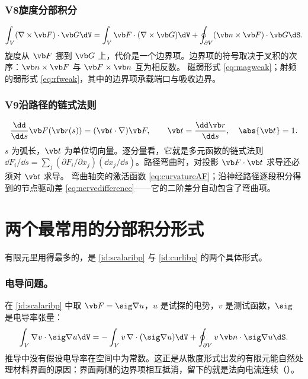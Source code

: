 \subsubsection{V8\quad 旋度分部积分}
\begin{equation*}
\int_V(\nabla\times\vb F)\cdot\vb G\dV
=\int_V\vb F\cdot(\nabla\times\vb G)\dV
+\oint_{\partial V}(\vb n\times\vb F)\cdot\vb G\dS .
\end{equation*}
旋度从 $\vb F$ 挪到 $\vb G$ 上，代价是一个边界项。边界项的符号取决于叉积的次序：$\vb n\times\vb F$ 与 $\vb F\times\vb n$ 互为相反数。
{磁弱形式 \eqref{eq:magweak}；射频的弱形式 \eqref{eq:rfweak}，其中的边界项承载端口与吸收边界。}

\subsubsection{V9\quad 沿路径的链式法则}
\begin{equation*}
\frac{\dd}{\dd s}\vb F(\vb r(s))=(\vb t\cdot\nabla)\vb F,
\qquad \vb t=\frac{\dd\vb r}{\dd s},\quad \abs{\vb t}=1 .
\end{equation*}
$s$ 为弧长，$\vb t$ 为单位切向量。逐分量看，它就是多元函数的链式法则 $\dd F_i/\dd s=\sum_j(\partial F_i/\partial x_j)(\dd x_j/\dd s)$。路径弯曲时，对投影 $\vb F\cdot\vb t$ 求导还必须对 $\vb t$ 求导。
{弯曲轴突的激活函数 \eqref{eq:curvatureAF}；沿神经路径逐段积分得到的节点驱动差 \eqref{eq:nervedifference}——它的二阶差分自动包含了弯曲项。}

\section{两个最常用的分部积分形式}\label{sec:app-ibp}

有限元里用得最多的，是 \eqref{id:scalaribp} 与 \eqref{id:curlibp} 的两个具体形式。

\subsubsection{电导问题。} 在 \eqref{id:scalaribp} 中取 $\vb F=\sig\nabla u$，$u$ 是试探的电势，$v$ 是测试函数，$\sig$ 是电导率张量：
\begin{equation*}
\int_V\nabla v\cdot\sig\nabla u\dV
=-\int_Vv\,\nabla\cdot(\sig\nabla u)\dV
+\oint_{\partial V}v\,\vb n\cdot\sig\nabla u\dS .
\end{equation*}
推导中没有假设电导率在空间中为常数。这正是从散度形式出发的有限元能自然处理材料界面的原因：界面两侧的边界项相互抵消，留下的就是法向电流连续（）。

